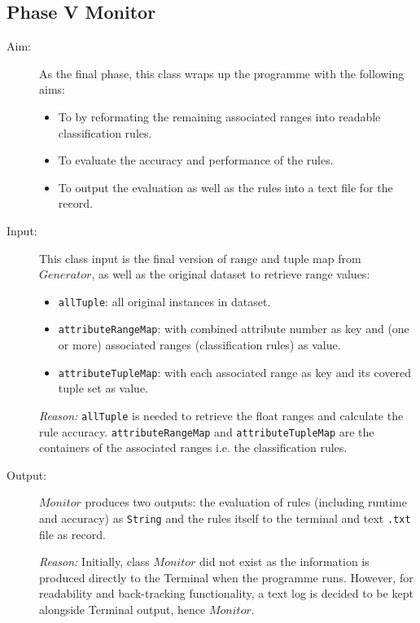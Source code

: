 \begin{description}
\end{description}


\subsection{Phase V Monitor}
\begin{description}

\item[Aim: ] As the final phase, this class wraps up the programme with the following aims:

\begin{itemize}
	\item{To by reformating the remaining associated ranges into readable classification rules.} 
	\item{To evaluate the accuracy and performance of the rules.} 
	\item{To output the evaluation as well as the rules into a text file for the record.} 
\end{itemize}

\item[Input: ] This class input is the final version of range and tuple map from $Generator$, as well as the original dataset to retrieve range values:
\begin{itemize}
	\item{\texttt{allTuple}:  all original instances in dataset.} 
	\item{\texttt{attributeRangeMap}: with combined attribute number as key and (one or more) associated ranges (classification rules) as value.}
	\item{\texttt{attributeTupleMap}: with each associated range as key and its covered tuple set as value.}
\end{itemize}

\textit{Reason: } \texttt{allTuple} is needed to retrieve the float ranges and calculate the rule accuracy. \texttt{attributeRangeMap} and \texttt{attributeTupleMap} are the containers of the associated ranges i.e. the classification rules.

\item[Output: ] $Monitor$ produces two outputs: the evaluation of rules (including runtime and accuracy) as \texttt{String} and the rules itself to the terminal and text \texttt{.txt} file as record. 
  
\textit{Reason: } Initially, class $Monitor$ did not exist as the information is produced directly to the Terminal when the programme runs. However, for readability and back-tracking functionality, a text log is decided to be kept alongside Terminal output, hence $Monitor$.  


\end{description}
